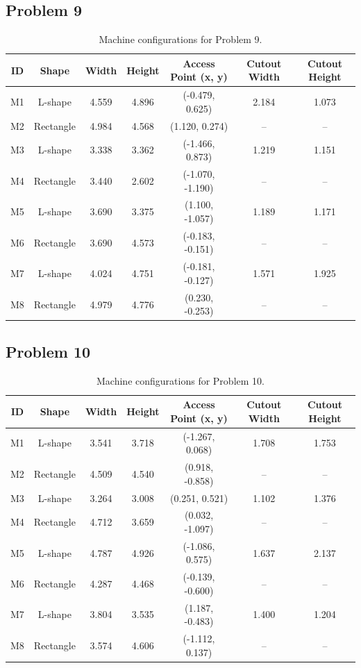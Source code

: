 \subsection{Problem 9}
\begin{table}[H]
\centering
\small
\begin{tabular}{ccccccc}
\toprule
\textbf{ID} & \textbf{Shape} & \textbf{Width} & \textbf{Height} & \textbf{Access Point (x, y)} & \textbf{Cutout Width} & \textbf{Cutout Height} \\
\midrule
M1 & L-shape   & 4.559 & 4.896 & (-0.479, 0.625)  & 2.184 & 1.073 \\
M2 & Rectangle & 4.984 & 4.568 & (1.120, 0.274)   & --    & --    \\
M3 & L-shape   & 3.338 & 3.362 & (-1.466, 0.873)  & 1.219 & 1.151 \\
M4 & Rectangle & 3.440 & 2.602 & (-1.070, -1.190) & --    & --    \\
M5 & L-shape   & 3.690 & 3.375 & (1.100, -1.057)  & 1.189 & 1.171 \\
M6 & Rectangle & 3.690 & 4.573 & (-0.183, -0.151) & --    & --    \\
M7 & L-shape   & 4.024 & 4.751 & (-0.181, -0.127) & 1.571 & 1.925 \\
M8 & Rectangle & 4.979 & 4.776 & (0.230, -0.253)  & --    & --    \\
\bottomrule
\end{tabular}
\caption{Machine configurations for Problem 9.}
\end{table}

\subsection{Problem 10}
\begin{table}[H]
\centering
\small
\begin{tabular}{ccccccc}
\toprule
\textbf{ID} & \textbf{Shape} & \textbf{Width} & \textbf{Height} & \textbf{Access Point (x, y)} & \textbf{Cutout Width} & \textbf{Cutout Height} \\
\midrule
M1 & L-shape   & 3.541 & 3.718 & (-1.267, 0.068)  & 1.708 & 1.753 \\
M2 & Rectangle & 4.509 & 4.540 & (0.918, -0.858)  & --    & --    \\
M3 & L-shape   & 3.264 & 3.008 & (0.251, 0.521)   & 1.102 & 1.376 \\
M4 & Rectangle & 4.712 & 3.659 & (0.032, -1.097)  & --    & --    \\
M5 & L-shape   & 4.787 & 4.926 & (-1.086, 0.575)  & 1.637 & 2.137 \\
M6 & Rectangle & 4.287 & 4.468 & (-0.139, -0.600) & --    & --    \\
M7 & L-shape   & 3.804 & 3.535 & (1.187, -0.483)  & 1.400 & 1.204 \\
M8 & Rectangle & 3.574 & 4.606 & (-1.112, 0.137)  & --    & --    \\
\bottomrule
\end{tabular}
\caption{Machine configurations for Problem 10.}
\end{table}

